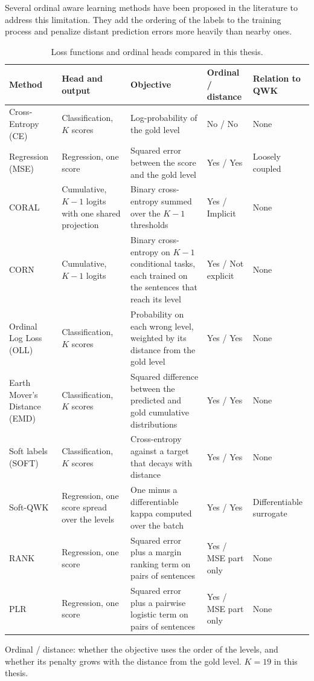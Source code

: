 \documentclass[12pt]{report}
\begin{document}
Several ordinal aware learning methods have been proposed in the literature to address this limitation. They add the ordering of the labels to the training process and penalize distant prediction errors more heavily than nearby ones.
\begin{table}[H]
\centering
\small
\caption{Loss functions and ordinal heads compared in this thesis.}
\label{tab:ordinal_methods}
\setlength{\tabcolsep}{4pt}
\renewcommand{\arraystretch}{1.2}
\begin{tabular}{p{2.5cm} p{2.3cm} p{3.9cm} p{1.4cm} p{1.6cm}}
\toprule
\textbf{Method} & \textbf{Head and output} & \textbf{Objective} & \textbf{Ordinal / distance} & \textbf{Relation to QWK} \\
\midrule
Cross-Entropy (CE) & Classification, $K$ scores & Log-probability of the gold level & No / No & None \\
Regression (MSE) \cite{elmadani2025barec} & Regression, one score & Squared error between the score and the gold level & Yes / Yes & Loosely coupled \\
CORAL \cite{cao2020coral} & Cumulative, $K{-}1$ logits with one shared projection & Binary cross-entropy summed over the $K{-}1$ thresholds & Yes / Implicit & None \\
CORN \cite{shi2023deep} & Cumulative, $K{-}1$ logits & Binary cross-entropy on $K{-}1$ conditional tasks, each trained on the sentences that reach its level & Yes / Not explicit & None \\
Ordinal Log Loss (OLL) \cite{castagnos2022ordinal} & Classification, $K$ scores & Probability on each wrong level, weighted by its distance from the gold level & Yes / Yes & None \\
Earth Mover's Distance (EMD) \cite{hou2017emd} & Classification, $K$ scores & Squared difference between the predicted and gold cumulative distributions & Yes / Yes & None \\
Soft labels (SOFT) \cite{bertinetto2020soft} & Classification, $K$ scores & Cross-entropy against a target that decays with distance & Yes / Yes & None \\
Soft-QWK \cite{delatorre2018wkl,diaz2019softlabels,trigui2025stbw} & Regression, one score spread over the levels & One minus a differentiable kappa computed over the batch & Yes / Yes & Differentiable surrogate \\
RANK \cite{trokhymovych2024open} & Regression, one score & Squared error plus a margin ranking term on pairs of sentences & Yes / MSE part only & None \\
PLR \cite{lee2022neural} & Regression, one score & Squared error plus a pairwise logistic term on pairs of sentences & Yes / MSE part only & None \\
\bottomrule
\end{tabular}

\vspace{0.15cm}
{\footnotesize Ordinal / distance: whether the objective uses the order of the levels, and whether its penalty grows with the distance from the gold level. $K = 19$ in this thesis.}
\end{table}
\end{document}
